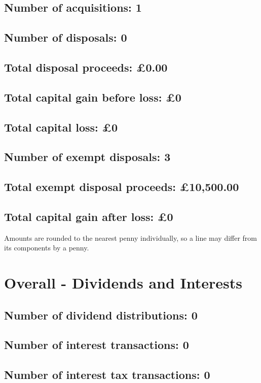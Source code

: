 \documentclass{article}
\begin{document}
\subsection*{Number of acquisitions: 1}
\subsection*{Number of disposals: 0}
\subsection*{Total disposal proceeds: £0.00}
\subsection*{Total capital gain before loss: £0}
\subsection*{Total capital loss: £0}
\subsection*{Number of exempt disposals: 3}
\subsection*{Total exempt disposal proceeds: £10,500.00}
\subsection*{Total capital gain after loss: £0}
\vspace{1em}
Amounts are rounded to the nearest penny individually, so a line may differ from its components by a penny.
\vspace{2em}
\section*{Overall - Dividends and Interests}
\subsection*{Number of dividend distributions: 0}
\subsection*{Number of interest transactions: 0}
\subsection*{Number of interest tax transactions: 0}
\end{document}
